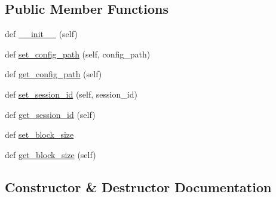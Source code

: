 \subsection*{Public Member Functions}
\begin{DoxyCompactItemize}
\item 
def \hyperlink{classNEAT__PyGenetics_1_1NEAT_1_1Networking_1_1Commands_1_1AnnounceSessionCommand_1_1AnnounceSessionCommand_a9ac1c2d236b717bc4b7ec521a7f3daa5}{\+\_\+\+\_\+init\+\_\+\+\_\+} (self)
\item 
def \hyperlink{classNEAT__PyGenetics_1_1NEAT_1_1Networking_1_1Commands_1_1AnnounceSessionCommand_1_1AnnounceSessionCommand_ace39d5d011d61bb501f16f78ae1b4997}{set\+\_\+config\+\_\+path} (self, config\+\_\+path)
\item 
def \hyperlink{classNEAT__PyGenetics_1_1NEAT_1_1Networking_1_1Commands_1_1AnnounceSessionCommand_1_1AnnounceSessionCommand_ade8f205209da28a137c8d361a4830c0b}{get\+\_\+config\+\_\+path} (self)
\item 
def \hyperlink{classNEAT__PyGenetics_1_1NEAT_1_1Networking_1_1Commands_1_1AnnounceSessionCommand_1_1AnnounceSessionCommand_a7c9eae1dc5ba08c0b44182a6db99fd27}{set\+\_\+session\+\_\+id} (self, session\+\_\+id)
\item 
def \hyperlink{classNEAT__PyGenetics_1_1NEAT_1_1Networking_1_1Commands_1_1AnnounceSessionCommand_1_1AnnounceSessionCommand_a3e3a2c23ea1b303a4892f77895dd9350}{get\+\_\+session\+\_\+id} (self)
\item 
def \hyperlink{classNEAT__PyGenetics_1_1NEAT_1_1Networking_1_1Commands_1_1AnnounceSessionCommand_1_1AnnounceSessionCommand_a4b4d1a2f45cbe7e4be0658a3751e9dc3}{set\+\_\+block\+\_\+size}
\item 
def \hyperlink{classNEAT__PyGenetics_1_1NEAT_1_1Networking_1_1Commands_1_1AnnounceSessionCommand_1_1AnnounceSessionCommand_af6a3e5c83d5d990c909ef038272d797e}{get\+\_\+block\+\_\+size} (self)
\end{DoxyCompactItemize}


\subsection{Constructor \& Destructor Documentation}
